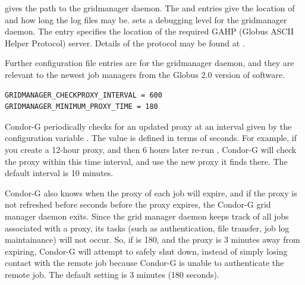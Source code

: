 gives the path to the gridmanager daemon.
The 
and
entries give the location of and how long
the log files may be.
sets a debugging level for the gridmanager daemon.
The
 entry specifies the location of the required
GAHP (Globus ASCII Helper Protocol) server.
Details of the protocol may be found at
.

Further configuration file entries are for the gridmanager daemon,
and they are relevant to
the newest job managers from the Globus 2.0 version of software.
\begin{verbatim}
GRIDMANAGER_CHECKPROXY_INTERVAL = 600
GRIDMANAGER_MINIMUM_PROXY_TIME = 180
\end{verbatim} 

Condor-G periodically checks for an updated proxy at
an interval given by the configuration variable
.
The value is defined in terms of seconds.
For example, if you create a 12-hour proxy, and then
6 hours later re-run ,
Condor-G will check the proxy within
this time interval, and use the new proxy it finds there.
The default interval is 10 minutes.

Condor-G also knows when the proxy of each job will expire,
and if the proxy is not refreshed before
seconds before the proxy expires,
the Condor-G grid manager daemon exits.
Since the grid manager daemon keeps track of all jobs
associated with a proxy, its tasks
(such as authentication, file transfer, job log maintainance)
will not occur.
So, if
is 180, and the proxy is 3 minutes away from
expiring, Condor-G will attempt to safely shut down,
instead of simply losing
contact with the remote job because Condor-G is unable to
authenticate the remote job.
The default setting is 3 minutes (180 seconds).

